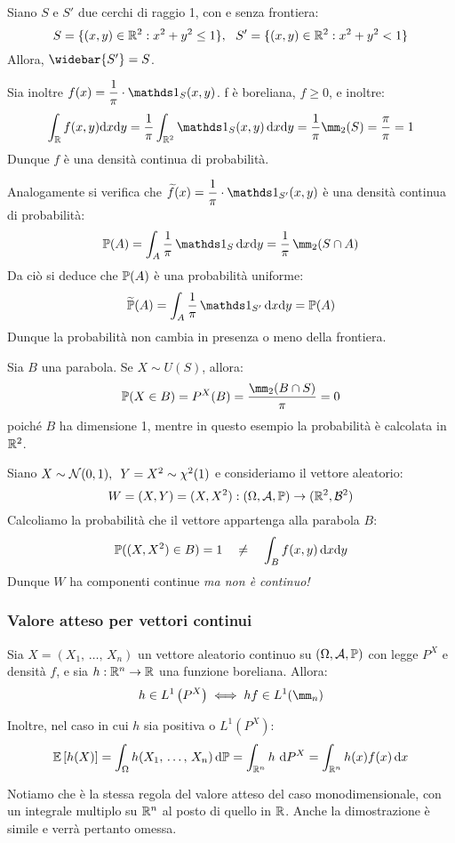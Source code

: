 \bigskip
\begin{ese}[caso $(\RR^2, \Bc^2)$]
  Siano $S$ e $S'$ due cerchi di raggio 1, con e senza frontiera:
  $$S = \{ (x, y) \in \RR^2: x^2 + y^2 \le 1 \}, \ \ S' = \{ (x, y) \in \RR^2: x^2 + y^2 < 1 \}$$
  Allora, $\widebar{S'} = S$.

  Sia inoltre $f(x) = \dfrac 1 \pi \cdot \Ind_S(x, y)$. f è boreliana, $f \ge 0$, e inoltre:
  $$\int_{\RR} f(x, y) \mathrm{d}x \mathrm{d}y
    = \dfrac 1 \pi \int_{\RR^2} \Ind_S(x, y) \, \dx \de y
    = \dfrac 1 \pi \mm_2(S) = \dfrac \pi \pi = 1$$
  Dunque $f$ è una densità continua di probabilità.

  Analogamente si verifica che $\widetilde{f}(x) = \dfrac 1 \pi \cdot \Ind_{S'}(x, y)$
  è una densità continua di probabilità:
  $$\PP(A) = \int_A \dfrac 1 \pi \, \Ind_{S} \, \dx \de y
    = \dfrac 1 \pi \, \mm_2 (S \cap A)$$
  Da ciò si deduce che $\mathbb P(A)$ è una probabilità uniforme:
  $$\widetilde{\PP}(A) = \int_A \dfrac 1 \pi \, \Ind_{S'} \, \dx \de y
    = \PP(A)$$
  Dunque la probabilità non cambia in presenza o meno della frontiera.

  Sia $B$ una parabola. Se $X \sim U(S)$, allora:
  $$\PP(X \in B) = P^X(B) = \dfrac {\mm_2(B \cap S)}{\pi} = 0$$
  poiché $B$ ha dimensione 1, mentre in questo esempio la probabilità è calcolata in $\mathbb R^2$.
\end{ese}

\bigskip
\begin{cese}\label{cese-parabola-normale}
  Siano $X \sim \mathcal N(0, 1), \enspace Y = X^2 \sim \chi^2(1)$ e consideriamo il vettore aleatorio:
    $$W = (X, Y) = (X, X^2) : \DoCo[2]$$
  Calcoliamo la probabilità che il vettore appartenga alla parabola $B$:
  $$\mathbb P((X, X^2) \in B) = 1 \quad \neq \quad \int_B f(x, y) \, \mathrm d x \mathrm d y$$
  Dunque $W$ ha componenti continue \textit{ma non è continuo!}
\end{cese}

\subsubsection{Valore atteso per vettori continui}

\begin{teo}
  Sia $X = (X_1, \, \dots, \, X_n)$ un vettore aleatorio continuo su $(\Omega,\mathcal A,\mathbb P)$ con legge $P^X$ e densità $f$,
  e sia $h: \mathbb R^n \to \mathbb R$ una funzione boreliana. Allora:
  $$ h \in L^1\left(P^X\right) \iff hf \in L^1(\mm_n)$$

  Inoltre, nel caso in cui $h$ sia positiva o $L^1(P^X)$:
  $$\mathbb E \left[ h(X) \right] = \int_\Omega h(X_1, \, \dots, \, X_n) \, \mathrm d \mathbb P = \int_{\mathbb R^n} h \ \mathrm d P^X = \int_{\mathbb R^n} h(x) f(x) \, \mathrm d x$$
\end{teo}
Notiamo che è la stessa regola del valore atteso del caso monodimensionale, con un integrale multiplo su $\mathbb R^n$ al posto di quello in $\mathbb R$. Anche la dimostrazione è simile e verrà pertanto omessa.


